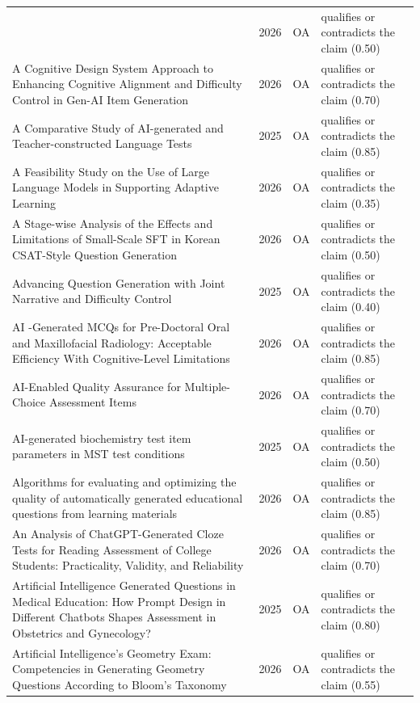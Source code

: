 \begin{longtable}{@{}%
  >{\raggedright\arraybackslash}p{}c%
  >{\raggedright\arraybackslash}p{}%
  >{\raggedright\arraybackslash}p{}@{}}
{[In Arabic: The efficiency of using ChatGPT in designing reading comprehension tests for students of English as a foreign language]} & 2026 & OA & qualifies or contradicts the claim (0.50) \\
A Cognitive Design System Approach to Enhancing Cognitive Alignment and Difficulty Control in Gen-AI Item Generation & 2026 & OA & qualifies or contradicts the claim (0.70) \\
A Comparative Study of AI-generated and Teacher-constructed Language Tests & 2025 & OA & qualifies or contradicts the claim (0.85) \\
A Feasibility Study on the Use of Large Language Models in Supporting Adaptive Learning & 2026 & OA & qualifies or contradicts the claim (0.35) \\
A Stage-wise Analysis of the Effects and Limitations of Small-Scale SFT in Korean CSAT-Style Question Generation & 2026 & OA & qualifies or contradicts the claim (0.50) \\
Advancing Question Generation with Joint Narrative and Difficulty Control & 2025 & OA & qualifies or contradicts the claim (0.40) \\
AI -Generated MCQs for Pre-Doctoral Oral and Maxillofacial Radiology: Acceptable Efficiency With Cognitive-Level Limitations & 2026 & OA & qualifies or contradicts the claim (0.85) \\
AI-Enabled Quality Assurance for Multiple-Choice Assessment Items & 2026 & OA & qualifies or contradicts the claim (0.70) \\
AI-generated biochemistry test item parameters in MST test conditions & 2025 & OA & qualifies or contradicts the claim (0.50) \\
Algorithms for evaluating and optimizing the quality of automatically generated educational questions from learning materials & 2026 & OA & qualifies or contradicts the claim (0.85) \\
An Analysis of ChatGPT-Generated Cloze Tests for Reading Assessment of College Students: Practicality, Validity, and Reliability & 2026 & OA & qualifies or contradicts the claim (0.70) \\
Artificial Intelligence Generated Questions in Medical Education: How Prompt Design in Different Chatbots Shapes Assessment in Obstetrics and Gynecology? & 2025 & OA & qualifies or contradicts the claim (0.80) \\
Artificial Intelligence's Geometry Exam: Competencies in Generating Geometry Questions According to Bloom's Taxonomy & 2026 & OA & qualifies or contradicts the claim (0.55) \\

\end{longtable}
